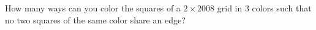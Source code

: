 How many ways can you color the squares of a $ 2 \times 2008$ grid in 3 colors such that no two squares of the same color share an edge?